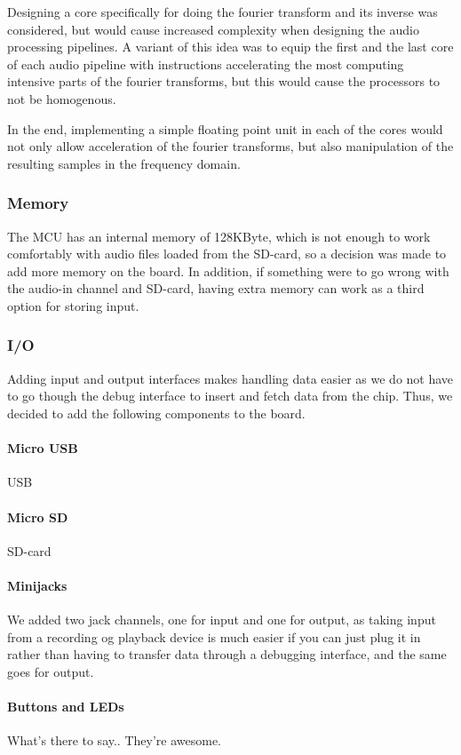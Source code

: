 Designing a core specifically for doing the fourier transform and its inverse
was considered, but would cause increased complexity when designing the audio
processing pipelines. A variant of this idea was to equip the first and the last
core of each audio pipeline with instructions accelerating the most computing
intensive parts of the fourier transforms, but this would cause the processors
to not be homogenous.

In the end, implementing a simple floating point unit in each of the cores
would not only allow acceleration of the fourier transforms, but also
manipulation of the resulting samples in the frequency domain.

\subsubsection{Memory} The MCU has an internal memory of 128KByte, which is not
enough to work comfortably with audio files loaded from the SD-card, so a
decision was made to add more memory on the board. In addition, if something
were to go wrong with the audio-in channel and SD-card, having extra memory can
work as a third option for storing input.

\subsubsection{I/O} Adding input and output interfaces makes handling data
easier as we do not have to go though the debug interface to insert and fetch
data from the chip. Thus, we decided to add the following components to the
board. 

\paragraph{Micro USB} USB 

\paragraph{Micro SD} SD-card 

\paragraph{Minijacks} We added two jack channels, one for input and one for
output, as taking input from a recording og playback device is much easier if
you can just plug it in rather than having to transfer data through a debugging
interface, and the same goes for output.

\paragraph{Buttons and LEDs} What's there to say.. They're awesome.
